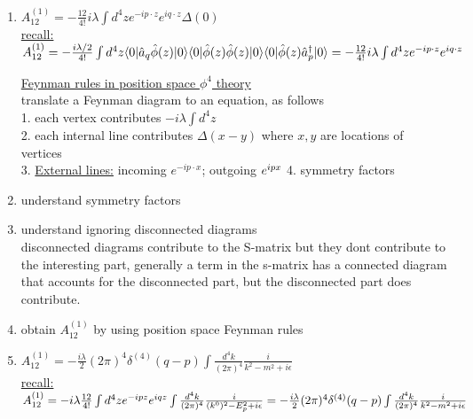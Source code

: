 \documentclass[12pt]{amsart}
\begin{document}
\begin{enumerate}
\item \underline{$A_{12}^{(1)} = - \frac{12}{4 !} i \lambda \int d^4 z e^{- i p \cdot z} e^{i q \cdot z} \Delta(0)$}\\
\underline{recall:} $A^{(1)}_{12} = - \frac{i \lambda/2}{4!} \int d^4 z \langle 0 | \hat{a}_q \hat{\phi}(z)| 0 \rangle \langle 0 | \hat{\phi}(z) \hat{\phi}(z) | 0 \rangle \langle 0 | \hat{\phi}(z) \hat{a}_p^{\dagger} | 0 \rangle\\
= - \frac{12}{4 !} i \lambda \int d^4 z e^{- i p \cdot z} e^{i q \cdot z}\\$


\hdashrule[0.5ex][c]{\linewidth}{0.5pt}{1.5mm}


\underline{Feynman rules in position space $\phi^4$ theory}\\
translate a Feynman diagram to an equation, as follows\\
1. each vertex contributes $- i \lambda \int d^4 z$\\
2. each internal line contributes $\Delta(x-y)$ where $x,y$ are locations of vertices\\
3. \underline{External lines:} incoming $e^{- i p \cdot x}$; outgoing $e^{i p x}\\$
4. symmetry factors\\
\item understand symmetry factors\\
\item understand ignoring disconnected diagrams\\
disconnected diagrams contribute to the S-matrix but they dont contribute to the interesting part, generally a term in the s-matrix has a connected diagram that accounts for the disconnected part, but the disconnected part does contribute.
\item obtain $A^{(1)}_{12}$ by using position space Feynman rules\\


\hdashrule[0.5ex][c]{\linewidth}{0.5pt}{1.5mm}


\item \underline{$A_{12}^{(1)} = - \frac{i \lambda}{2} ( 2 \pi)^4 \delta^{(4)}(q - p) \int \frac{d^4 k}{(2 \pi)^4} \frac{i}{k^2 - m^2 + i \epsilon}$}\\
\underline{recall:} $A^{(1)}_{12} = - i \lambda \frac{12}{4 !} \int d^4 z e^{-i p z} e^{i q z} \int \frac{d^4 k}{(2 \pi)^4} \frac{i}{(k^0)^2 - E_p^2 + i \epsilon}\\
= - \frac{i \lambda}{2} (2 \pi)^4 \delta^{(4)} ( q- p) \int \frac{d^4k}{(2 \pi)^4} \frac{i}{k^2 - m^2 + i \epsilon}\\$



\end{enumerate}
\end{document}
